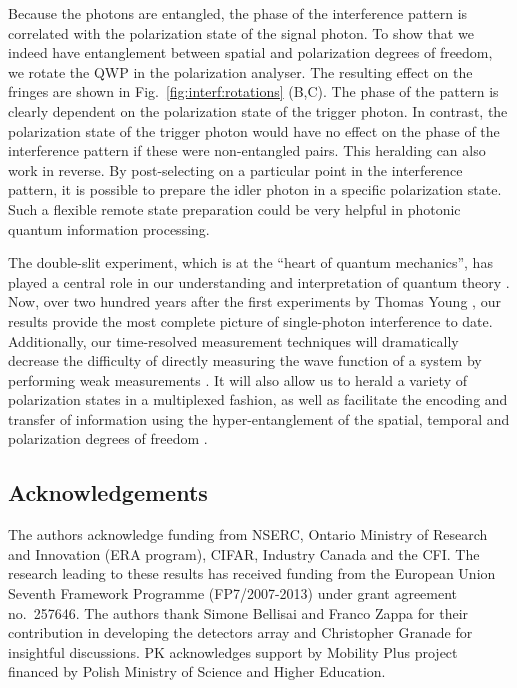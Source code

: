 \documentclass[prl,reprint,twocolumn,amsmath,preprintnumbers,amssymb,superscriptaddress]{revtex4-1}
\newcommand{\figref}[1]{Fig.~\ref{#1}}
\begin{document}
Because the photons are entangled, the phase of the interference pattern is correlated with the polarization state of the signal photon. To show that we indeed have entanglement between spatial and polarization degrees of freedom, we rotate the QWP in the polarization analyser. The resulting effect on the fringes are shown in \figref{fig:interf:rotations} (B,C). The phase of the pattern is clearly dependent on the polarization state of the trigger photon. In contrast, the polarization state of the trigger photon would have no effect on the phase of the interference pattern if these were non-entangled pairs. This heralding can also work in reverse. By post-selecting on a particular point in the interference pattern, it is possible to prepare the idler photon in a specific polarization state. Such a flexible remote state preparation could be very helpful in photonic quantum information processing.


The double-slit experiment, which is at the ``heart of quantum mechanics'', has played a central role in our understanding and interpretation of quantum theory \cite{Feynman1965}. Now, over two hundred years after the first experiments by Thomas Young \cite{Young1802,Young1804}, our results provide the most complete picture of single-photon interference to date. Additionally, our time-resolved measurement techniques will dramatically decrease the difficulty of directly measuring the wave function of a system by performing weak measurements \cite{Kocsis2011,Lundeen2011}.  It will also allow us to herald a variety of polarization states in a multiplexed fashion, as well as facilitate the encoding and transfer of information using the hyper-entanglement of the spatial, temporal and polarization degrees of freedom \cite{Barreiro2005,Fickler2012,Kolenderski2011}.


\subsection{Acknowledgements}
The authors  acknowledge  funding from NSERC, Ontario Ministry of Research and Innovation (ERA program), CIFAR, Industry Canada and the CFI. The research leading to these results has received funding from the European Union Seventh Framework Programme (FP7/2007-2013) under grant agreement no.~257646. The authors thank Simone Bellisai and Franco Zappa for their contribution in developing the detectors array and Christopher Granade for insightful discussions. PK acknowledges support by Mobility Plus project financed by Polish Ministry of Science and Higher Education.
\end{document}

